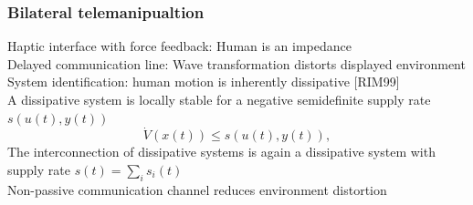\documentclass[student]{ITRslides}
\begin{document}
%	
%		
%	


\begin{frame}
	\frametitle{Bilateral telemanipualtion}
	Haptic interface with force feedback: Human is an impedance\\
	Delayed communication line: Wave transformation distorts displayed environment\\   
		System identification: human motion is inherently dissipative \nocite{Rahman1999}{\tiny [RIM99]}\\
		 A dissipative system is locally stable for a negative semidefinite supply rate $s\left(u(t),y(t)\right)$
		 \[
\dot{V}(x(t)) \leq s(u(t),y(t)),
\]
The interconnection of dissipative systems is again a dissipative system with supply rate $s(t) = \sum_{i} s_i(t)$\\
Non-passive communication channel reduces environment distortion 

			\begin{figure}
			\centering
			\tiny
			\def\svgwidth{0.8\columnwidth}
											
			\end{figure}


\end{frame}
\end{document}
